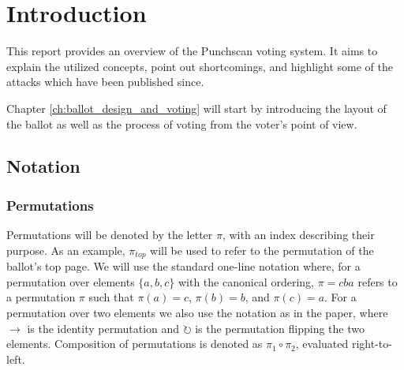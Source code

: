 \chapter{Introduction}
\label{chapter:introduction}

This report provides an overview of the Punchscan voting system. It aims to
explain the utilized concepts, point out shortcomings, and highlight some of
the attacks which have been published since.

Chapter \ref{ch:ballot_design_and_voting} will start by introducing the layout
of the ballot as well as the process of voting from the voter's point of view.


\section{Notation}

\subsection{Permutations}

Permutations will be denoted by the letter $\pi$, with an index describing
their purpose. As an example, $\pi_{top}$ will be used to refer to the
permutation of the ballot's top page. We will use the standard one-line
notation where, for a permutation over elements $\{a, b, c\}$ with the canonical
ordering, $\pi = cba$ refers to a permutation $\pi$ such that $\pi(a) = c$,
$\pi(b) = b$, and $\pi(c) = a$. For a permutation over two elements we also use
the notation as in the paper, where $\rightarrow$ is the identity
permutation and $\circlearrowright$ is the permutation flipping the two
elements. Composition of permutations is denoted as $\pi_1 \circ \pi_2$,
evaluated right-to-left.
